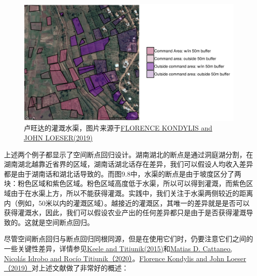 \documentclass[cn,12pt,math=newtx,citestyle=gb7714-2015,bibstyle=gb7714-2015]{elegantbook}
\begin{document}
	\begin{figure}[tbph]
		\centering
		\includegraphics[width=1\linewidth]{irrigation}
		\caption{卢旺达的灌溉水渠，图片来源于\href{https://blogs.worldbank.org/impactevaluations/spatial-jumps}{FLORENCE KONDYLIS and JOHN LOESER(2019)}}
		\label{fig:irrigation}
	\end{figure}
	
	上述两个例子都显示了空间断点回归设计。湖南湖北的断点是通过洞庭湖分割，在湖南湖北越靠近省界的区域，湖南话湖北话存在差异，我们可以假设人均收入差异都是由于湖南话和湖北话导致的。而图9.8中，水渠的断点是由于坡度区分了两块：粉色区域和紫色区域。粉色区域高度低于水渠，所以可以得到灌溉，而紫色区域由于在水渠上方，所以不能获得灌溉。实践中，我们关注于水渠两侧较近的距离内（例如，50米以内的灌溉区域）。越接近的灌溉区，其唯一的差异就是是否可以获得灌溉水，因此，我们可以假设农业产出的任何差异都只是由于是否获得灌溉导致的。这就是空间断点回归。
	
	尽管空间断点回归与断点回归同根同源，但是在使用它们时，仍要注意它们之间的一些关键性差异，详情参见\href{https://www.semanticscholar.org/paper/Geographic-Boundaries-as-Regression-Discontinuities-Keele-Titiunik/5512e7591e86963e89a39984e770b0656fa2b0e2?p2df}{Keele and Titiunik(2015)}和\href{https://www.cambridge.org/core/elements/abs/practical-introduction-to-regression-discontinuity-designs/F04907129D5C1B823E3DB19C31CAB905}{Matias D. Cattaneo, Nicolás Idrobo and Rocío Titiunik（2020）}。\href{https://blogs.worldbank.org/impactevaluations/spatial-jumps}{Florence Kondylis and John Loeser（2019）}对上述文献做了非常好的概述：
	
\end{document}
